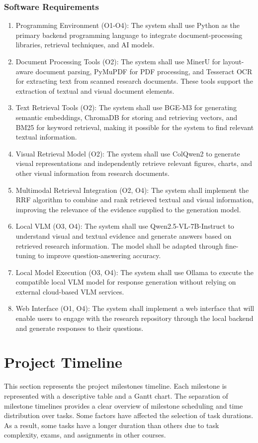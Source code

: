 \documentclass[11pt,a4paper]{report}
\begin{document}
\subsubsection{Software Requirements}
\begin{enumerate}
  \item Programming Environment (O1-O4): The system shall use Python as the primary backend programming language to integrate document-processing libraries, retrieval techniques, and AI models.
  \item Document Processing Tools (O2): The system shall use MinerU for layout-aware document parsing, PyMuPDF for PDF processing, and Tesseract \ac{OCR} for extracting text from scanned research documents. These tools support the extraction of textual and visual document elements.
  \item Text Retrieval Tools (O2): The system shall use BGE-M3 for generating semantic embeddings, ChromaDB for storing and retrieving vectors, and \ac{BM25} for keyword retrieval, making it possible for the system to find relevant textual information.
  \item Visual Retrieval Model (O2): The system shall use ColQwen2 to generate visual representations and independently retrieve relevant figures, charts, and other visual information from research documents.
  \item Multimodal Retrieval Integration (O2, O4): The system shall implement the \ac{RRF} algorithm to combine and rank retrieved textual and visual information, improving the relevance of the evidence supplied to the generation model.
  \item Local \ac{VLM} (O3, O4): The system shall use Qwen2.5-VL-7B-Instruct to understand visual and textual evidence and generate answers based on retrieved research information. The model shall be adapted through fine-tuning to improve question-answering accuracy.
  \item Local Model Execution (O3, O4): The system shall use Ollama to execute the compatible local \ac{VLM} model for response generation without relying on external cloud-based \ac{VLM} services.
  \item Web Interface (O1, O4): The system shall implement a web interface that will enable users to engage with the research repository through the local backend and generate responses to their questions.
\end{enumerate}

\cleardoublepage
\section{Project Timeline}
This section represents the project milestones timeline. Each milestone is represented with a descriptive table and a Gantt chart. The separation of milestone timelines provides a clear overview of milestone scheduling and time distribution over tasks. Some factors have affected the selection of task durations. As a result, some tasks have a longer duration than others due to task complexity, exams, and assignments in other courses.
\end{document}
